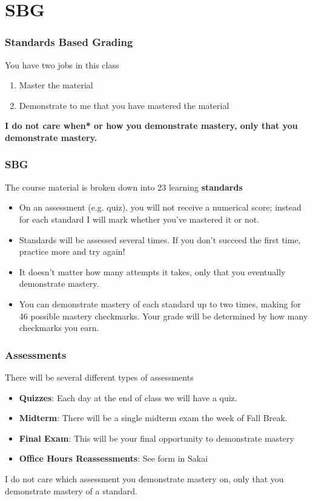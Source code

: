 \documentclass{beamer}
\begin{document}
\section{SBG}
\begin{frame}\frametitle{Standards Based Grading}
You have two jobs in this class
\begin{enumerate}
\item Master the material
\item Demonstrate to me that you have mastered the material
\end{enumerate}

\vspace{0.2in}

{\bf I do not care when* or how you demonstrate mastery, only that you demonstrate mastery.}
\end{frame}

\begin{frame}\frametitle{SBG}
The course material is broken down into 23 learning {\bf standards}
\begin{itemize}
\item On an assessment (e.g. quiz), you will not receive a numerical score; instead for each standard I will mark whether you've mastered it or not.
\item Standards will be assessed several times.  If you don't succeed the first time, practice more and try again!  
\item It doesn't matter how many attempts it takes, only that you eventually demonstrate mastery.
\item You can demonstrate mastery of each standard up to two times, making for 46 possible mastery checkmarks.  Your grade will be determined by how many checkmarks you earn.
\end{itemize}
\end{frame}

\begin{frame}\frametitle{Assessments}
There will be several different types of assessments
\begin{itemize}
\item {\bf Quizzes}: Each day at the end of class we will have a quiz.
\item {\bf Midterm}: There will be a single midterm exam the week of Fall Break.
\item {\bf Final Exam}: This will be your final opportunity to demonstrate mastery
\item {\bf Office Hours Reassessments}: See form in Sakai
\end{itemize}

\vspace{0.2in}

I do not care which assessment you demonstrate mastery on, only that you demonstrate mastery of a standard.
\end{frame}
\end{document}
